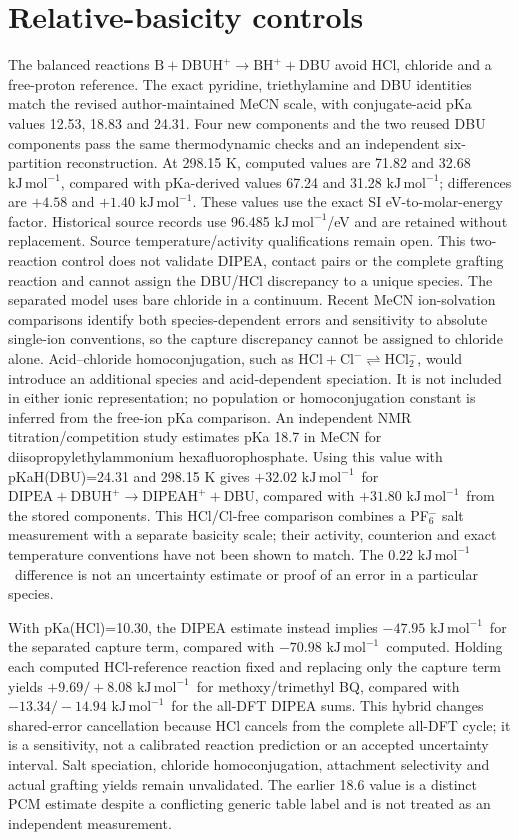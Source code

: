 \documentclass[11pt]{article}
\newcommand{\kj}{\ensuremath{\mathrm{kJ\,mol^{-1}}}}
\begin{document}
\section{Relative-basicity controls}
The balanced reactions $\mathrm{B+DBUH^+\rightarrow BH^++DBU}$ avoid HCl, chloride and a free-proton reference. The exact pyridine, triethylamine and DBU identities match the revised author-maintained MeCN scale, with conjugate-acid pKa values 12.53, 18.83 and 24.31.\cite{basicity2019,pkaTables} Four new components and the two reused DBU components pass the same thermodynamic checks and an independent six-partition reconstruction. At 298.15 K, computed values are 71.82 and 32.68 \kj, compared with pKa-derived values 67.24 and 31.28 \kj; differences are $+4.58$ and $+1.40$ \kj. These values use the exact SI eV-to-molar-energy factor. Historical source records use 96.485 \kj/eV and are retained without replacement. Source temperature/activity qualifications remain open. This two-reaction control does not validate DIPEA, contact pairs or the complete grafting reaction and cannot assign the DBU/HCl discrepancy to a unique species. The separated model uses bare chloride in a continuum. Recent MeCN ion-solvation comparisons identify both species-dependent errors and sensitivity to absolute single-ion conventions, so the capture discrepancy cannot be assigned to chloride alone.\cite{pliego2024} Acid--chloride homoconjugation, such as $\mathrm{HCl+Cl^-\rightleftharpoons HCl_2^-}$, would introduce an additional species and acid-dependent speciation. It is not included in either ionic representation; no population or homoconjugation constant is inferred from the free-ion pKa comparison.
An independent NMR titration/competition study estimates pKa 18.7 in MeCN for diisopropylethylammonium hexafluorophosphate.\cite{cook2024dipea} Using this value with pKaH(DBU)=24.31 and 298.15 K gives $+32.02$ \kj\ for $\mathrm{DIPEA+DBUH^+\rightarrow DIPEAH^++DBU}$, compared with $+31.80$ \kj\ from the stored components. This HCl/Cl-free comparison combines a PF$_6^-$ salt measurement with a separate basicity scale; their activity, counterion and exact temperature conventions have not been shown to match. The $0.22$ \kj\ difference is not an uncertainty estimate or proof of an error in a particular species.

With pKa(HCl)=10.30, the DIPEA estimate instead implies $-47.95$ \kj\ for the separated capture term, compared with $-70.98$ \kj\ computed. Holding each computed HCl-reference reaction fixed and replacing only the capture term yields $+9.69/+8.08$ \kj\ for methoxy/trimethyl BQ, compared with $-13.34/-14.94$ \kj\ for the all-DFT DIPEA sums. This hybrid changes shared-error cancellation because HCl cancels from the complete all-DFT cycle; it is a sensitivity, not a calibrated reaction prediction or an accepted uncertainty interval. Salt speciation, chloride homoconjugation, attachment selectivity and actual grafting yields remain unvalidated. The earlier 18.6 value is a distinct PCM estimate despite a conflicting generic table label and is not treated as an independent measurement.\cite{heldebrant2011}
\end{document}
